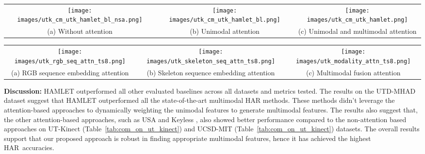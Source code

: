 \documentclass[runningheads]{llncs}
\newcommand{\pa}{HAMLET}
\begin{document}
\begin{figure*}[!t]
  \centering
  \begin{tabular}{*{3}{c}}
    \texttt{[image: images/utk\_cm\_utk\_hamlet\_bl\_nsa.png]} &
    \texttt{[image: images/utk\_cm\_utk\_hamlet\_bl.png]} &
    \texttt{[image: images/utk\_cm\_utk\_hamlet.png]} \\
    \footnotesize{(a) Without attention} & \footnotesize{(b) Unimodal attention} & \footnotesize{(c) Unimodal and multimodal attention} \\
  \end{tabular}
  \caption{Comparative impact of multimodal and unimodal attention in {\pa } for different activities on UT-Kinect dataset.}
  \label{fig:com_cm}
\end{figure*}

\begin{figure*}[!t]
  \centering
  \begin{tabular}{*{3}{c}}
    \texttt{[image: images/utk\_rgb\_seq\_attn\_ts8.png]} &
    \texttt{[image: images/utk\_skeleton\_seq\_attn\_ts8.png]} & \texttt{[image: images/utk\_modality\_attn\_ts8.png]} \\
    \footnotesize{(a) RGB sequence embedding attention} & \footnotesize{(b) Skeleton sequence embedding attention} & \footnotesize{(c) Multimodal fusion attention} \\
  \end{tabular}
  \caption{Multimodal and unimodal attention visualization for different activities on UT-Kinect Dataset.}
  \label{fig:vis_attention}
\end{figure*}




{\textbf{Discussion:}} {\pa } outperformed all other evaluated baselines across all datasets and metrics tested. The results on the UTD-MHAD dataset suggest that {\pa } outperformed all the state-of-the-art multimodal HAR methods. These methods didn't leverage the attention-based approaches to dynamically weighting the unimodal features to generate multimodal features. The results also suggest that, the other attention-based approaches, such as USA and Keyless \cite{keyless}, also showed better performance compared to the non-attention based approaches on UT-Kinect (Table~\ref{tab:com_on_ut_kinect}) and UCSD-MIT (Table~\ref{tab:com_on_ut_kinect}) datasets. The overall results support that our proposed approach is robust in finding appropriate multimodal features, hence it has achieved the highest HAR~accuracies.    
\end{document}
